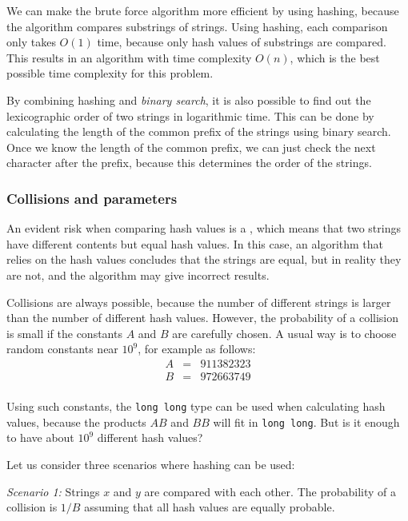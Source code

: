 We can make the brute force algorithm more efficient
by using hashing, because the algorithm compares
substrings of strings.
Using hashing, each comparison only takes $O(1)$ time,
because only hash values of substrings are compared.
This results in an algorithm with time complexity $O(n)$,
which is the best possible time complexity for this problem.

By combining hashing and \emph{binary search},
it is also possible to find out the lexicographic order of
two strings in logarithmic time.
This can be done by calculating the length
of the common prefix of the strings using binary search.
Once we know the length of the common prefix,
we can just check the next character after the prefix,
because this determines the order of the strings.

\subsubsection*{Collisions and parameters}


An evident risk when comparing hash values is
a , which means that two strings have
different contents but equal hash values.
In this case, an algorithm that relies on
the hash values concludes that the strings are equal,
but in reality they are not,
and the algorithm may give incorrect results.

Collisions are always possible,
because the number of different strings is larger
than the number of different hash values.
However, the probability of a collision is small
if the constants $A$ and $B$ are carefully chosen.
A usual way is to choose random constants
near $10^9$, for example as follows:
\[
    \begin{array}{lcl}
        A & = & 911382323 \\
        B & = & 972663749 \\
    \end{array}
\]

Using such constants,
the \texttt{long long} type can be used
when calculating hash values,
because the products $AB$ and $BB$ will fit in \texttt{long long}.
But is it enough to have about $10^9$ different hash values?

Let us consider three scenarios where hashing can be used:

\textit{Scenario 1:} Strings $x$ and $y$ are compared with
each other.
The probability of a collision is $1/B$ assuming that
all hash values are equally probable.

